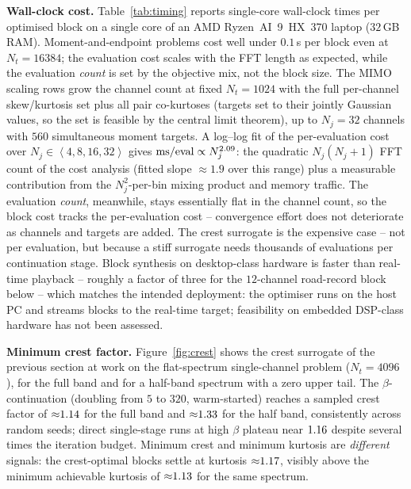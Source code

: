 \documentclass[10pt,a4paper]{article}
\numberwithin{equation}{section}
\newcommand{\seq}[1]{\left<#1\right>}
\newcommand{\mat}[1]{\left(#1\right)}
\newcommand{\m}[1]{\mathrm{#1}}
\begin{document}
\textbf{Wall-clock cost.} Table~\ref{tab:timing} reports single-core wall-clock times per optimised block on a single core of an AMD Ryzen~AI~9~HX~370 laptop ($32\,$GB RAM). Moment-and-endpoint problems cost well under $0.1\,$s per block even at $N_t = 16384$; the evaluation cost scales with the FFT length as expected, while the evaluation \emph{count} is set by the objective mix, not the block size. The MIMO scaling rows grow the channel count at fixed $N_t = 1024$ with the full per-channel skew/kurtosis set plus all pair co-kurtoses (targets set to their jointly Gaussian values, so the set is feasible by the central limit theorem), up to $N_j = 32$ channels with $560$ simultaneous moment targets. A log--log fit of the per-evaluation cost over $N_j \in \seq{4, 8, 16, 32}$ gives ${\m{ms/eval} \propto N_j^{\scalingslope}}$: the quadratic $N_j\mat{N_j+1}$ FFT count of the cost analysis (fitted slope ${\approx}1.9$ over this range) plus a measurable contribution from the $N_j^2$-per-bin mixing product and memory traffic. The evaluation \emph{count}, meanwhile, stays essentially flat in the channel count, so the block cost tracks the per-evaluation cost -- convergence effort does not deteriorate as channels and targets are added. The crest surrogate is the expensive case -- not per evaluation, but because a stiff surrogate needs thousands of evaluations per continuation stage. Block synthesis on desktop-class hardware is faster than real-time playback -- roughly a factor of three for the $12$-channel road-record block below -- which matches the intended deployment: the optimiser runs on the host PC and streams blocks to the real-time target; feasibility on embedded DSP-class hardware has not been assessed.

\begin{table}[htb]
\centering

\caption{Wall-clock cost per optimised block (single core, AMD Ryzen AI 9 HX 370). ``Evals'' counts objective/gradient evaluations to the stop criterion of the corresponding example; the MIMO scaling rows use per-channel skew/kurtosis plus all pair co-kurtoses at their jointly Gaussian values.}
\label{tab:timing}
\end{table}

\textbf{Minimum crest factor.} Figure~\ref{fig:crest} shows the crest surrogate of the previous section at work on the flat-spectrum single-channel problem ($N_t = 4096$), for the full band and for a half-band spectrum with a zero upper tail. The $\beta$-continuation (doubling from $5$ to $320$, warm-started) reaches a sampled crest factor of ${\approx}1.14$ for the full band and ${\approx}1.33$ for the half band, consistently across random seeds; direct single-stage runs at high $\beta$ plateau near $1.16$ despite several times the iteration budget. Minimum crest and minimum kurtosis are \emph{different} signals: the crest-optimal blocks settle at kurtosis ${\approx}1.17$, visibly above the minimum achievable kurtosis of ${\approx}1.13$ for the same spectrum.
\end{document}
